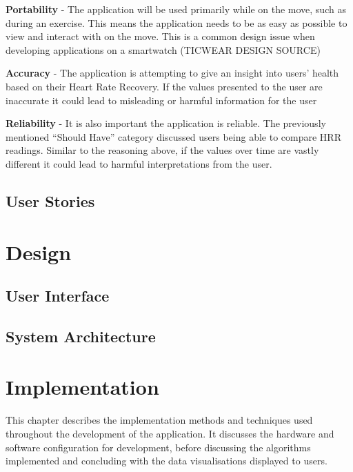 \documentclass{l4proj}
\begin{document}
\textbf{Portability} -  The application will be used primarily while on the move, such as during an exercise. This means the application needs to be as easy as possible to view and interact with on the move. This is a common design issue when developing applications on a smartwatch (TICWEAR DESIGN SOURCE)

\textbf{Accuracy} - The application is attempting to give an insight into users' health based on their Heart Rate Recovery. If the values presented to the user are inaccurate it could lead to misleading or harmful information for the user

\textbf{Reliability} - It is also important the application is reliable. The previously mentioned “Should Have” category discussed users being able to compare HRR readings. Similar to the reasoning above, if the values over time are vastly different it could lead to harmful interpretations from the user.

\section{User Stories}

\chapter{Design}

\section{User Interface}

\section{System Architecture}

\chapter{Implementation}

This chapter describes the implementation methods and techniques used throughout the development of the application. It discusses the hardware and software configuration for development, before discussing the algorithms implemented and concluding with the data visualisations displayed to users.
\end{document}
